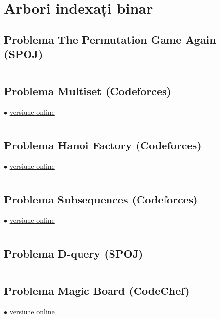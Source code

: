 \documentclass[../main.tex]{subfiles}
\begin{document}
\chapter{Arbori indexați binar}

\section{Problema The Permutation Game Again (SPOJ)}
\label{code:the-permutation-game-again}

\inputminted{cpp}{../src/fenwick-trees/the-permutation-game-again.cpp}

\section{Problema Multiset (Codeforces)}
\label{code:multiset}
$\bullet$
\href{https://codeforces.com/contest/1354/submission/346789750}{versiune online}

\inputminted{cpp}{../src/fenwick-trees/multiset.cpp}

\section{Problema Hanoi Factory (Codeforces)}
\label{code:hanoi-factory}
$\bullet$
\href{https://codeforces.com/contest/777/submission/280692043}{versiune online}

\inputminted{cpp}{../src/fenwick-trees/hanoi-factory.cpp}

\section{Problema Subsequences (Codeforces)}
\label{code:subsequences}
$\bullet$
\href{https://codeforces.com/contest/597/submission/280584811}{versiune online}

\inputminted{cpp}{../src/fenwick-trees/subsequences.cpp}

\section{Problema D-query (SPOJ)}
\label{code:dquery-fenwick}

\inputminted{cpp}{../src/fenwick-trees/dquery.cpp}

\section{Problema Magic Board (CodeChef)}
\label{code:mboard}
$\bullet$
\href{https://www.codechef.com/viewsolution/1088089860}{versiune online}
\end{document}
